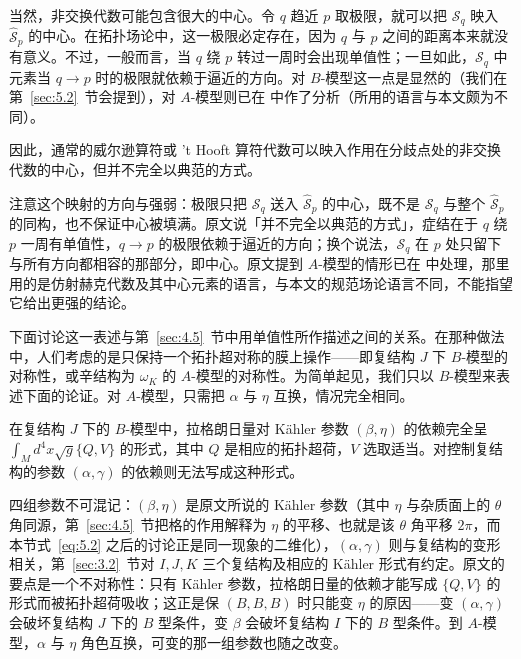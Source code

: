 当然，非交换代数可能包含很大的中心。令 $q$ 趋近 $p$ 取极限，就可以把 ${\mathcal S}_{q}$ 映入 $\hat {\mathcal S}_p$ 的中心。在拓扑场论中，这一极限必定存在，因为 $q$ 与 $p$ 之间的距离本来就没有意义。不过，一般而言，当 $q$ 绕 $p$ 转过一周时会出现单值性；一旦如此，${\mathcal S}_{q}$ 中元素当 $q\to p$ 时的极限就依赖于逼近的方向。对 $B$-模型这一点是显然的（我们在第~\ref{sec:5.2}~节会提到），对 $A$-模型则已在 \cite{ref75} 中作了分析（所用的语言与本文颇为不同）。

因此，通常的威尔逊算符或 't Hooft 算符代数可以映入作用在分歧点处的非交换代数的中心，但并不完全以典范的方式。

\begin{yizhu}[易错点]
注意这个映射的方向与强弱：极限只把 ${\mathcal S}_{q}$ 送入 $\hat {\mathcal S}_p$ 的中心，既不是 ${\mathcal S}_{q}$ 与整个 $\hat {\mathcal S}_p$ 的同构，也不保证中心被填满。原文说「并不完全以典范的方式」，症结在于 $q$ 绕 $p$ 一周有单值性，$q\to p$ 的极限依赖于逼近的方向；换个说法，${\mathcal S}_{q}$ 在 $p$ 处只留下与所有方向都相容的那部分，即中心。原文提到 $A$-模型的情形已在 \cite{ref75} 中处理，那里用的是仿射赫克代数及其中心元素的语言，与本文的规范场论语言不同，不能指望它给出更强的结论。
\end{yizhu}

\bigskip{}

下面讨论这一表述与第~\ref{sec:4.5}~节中用单值性所作描述之间的关系。在那种做法中，人们考虑的是只保持一个拓扑超对称的膜上操作——即复结构 $J$ 下 $B$-模型的对称性，或辛结构为 $\omega_K$ 的 $A$-模型的对称性。为简单起见，我们只以 $B$-模型来表述下面的论证。对 $A$-模型，只需把 $\alpha$ 与 $\eta$ 互换，情况完全相同。

在复结构 $J$ 下的 $B$-模型中，拉格朗日量对 Kähler 参数 $(\beta,\eta)$ 的依赖完全呈 $\int_M d^4x\sqrt g \{Q,V\}$ 的形式，其中 $Q$ 是相应的拓扑超荷，$V$ 选取适当。对控制复结构的参数 $(\alpha,\gamma)$ 的依赖则无法写成这种形式。

\begin{yizhu}[易错点]
四组参数不可混记：$(\beta,\eta)$ 是原文所说的 Kähler 参数（其中 $\eta$ 与杂质面上的 $\theta$ 角同源，第~\ref{sec:4.5}~节把格的作用解释为 $\eta$ 的平移、也就是该 $\theta$ 角平移 $2\pi$，而本节式~\eqref{eq:5.2} 之后的讨论正是同一现象的二维化），$(\alpha,\gamma)$ 则与复结构的变形相关，第~\ref{sec:3.2}~节对 $I,J,K$ 三个复结构及相应的 Kähler 形式有约定。原文的要点是一个不对称性：只有 Kähler 参数，拉格朗日量的依赖才能写成 $\{Q,V\}$ 的形式而被拓扑超荷吸收；这正是保 $(B,B,B)$ 时只能变 $\eta$ 的原因——变 $(\alpha,\gamma)$ 会破坏复结构 $J$ 下的 $B$ 型条件，变 $\beta$ 会破坏复结构 $I$ 下的 $B$ 型条件。到 $A$-模型，$\alpha$ 与 $\eta$ 角色互换，可变的那一组参数也随之改变。
\end{yizhu}


